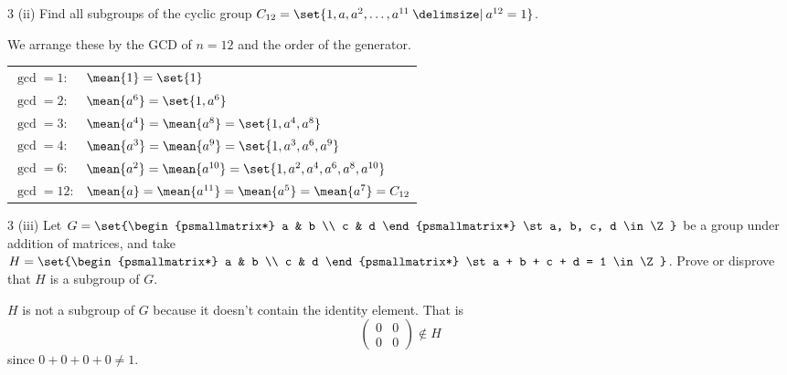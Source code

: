 \documentclass[11pt]{penrose}
\let\cyclic\mean
\begin{document}
\begin{problem}{3 (ii)}
    Find all subgroups of the cyclic group $C_{12} = \set{1, a, a^2, \dots, a^{11} \st a^{12}=1}$.

    \solution We arrange these by the GCD of $n = 12$ and the order of the generator.
    \begin{center}
    \begin{tabularx}{0.8\textwidth}{p{20mm}L}
        $\gcd = 1$: & $\cyclic{1} = \set{1}$\\
        $\gcd = 2$: & $\cyclic{a^6} = \set{1, a^6}$\\
        $\gcd = 3$: & $\cyclic{a^4} = \cyclic{a^8} = \set{1, a^4, a^8}$\\
        $\gcd = 4$: & $\cyclic{a^3} = \cyclic{a^9} = \set{1, a^3, a^6, a^9}$\\
        $\gcd = 6$: & $\cyclic{a^2} = \cyclic{a^{10}} = \set{1, a^2, a^4, a^6, a^8, a^{10}}$\\
        $\gcd = 12$: & $\cyclic{a} = \cyclic{a^{11}} = \cyclic{a^5} = \cyclic{a^7} = C_{12}$\\
    \end{tabularx}
    \end{center}
\end{problem}

\begin{problem}{3 (iii)}
    Let $G = \set{\begin{psmallmatrix*} a & b \\ c & d \end{psmallmatrix*} \st a, b, c, d \in \Z}$ be a group under addition of matrices, and take $H = \set{\begin{psmallmatrix*} a & b \\ c & d \end{psmallmatrix*} \st a + b + c + d = 1 \in \Z}$. Prove or disprove that $H$ is a subgroup of $G$.

    \solution $H$ is not a subgroup of $G$ because it doesn't contain the identity element. That is
    \begin{equation*}
        \begin{pmatrix*} 0 & 0 \\ 0 & 0 \end{pmatrix*} \notin H
    \end{equation*}
    since $0 + 0 + 0 + 0  \neq 1$.
\end{problem}
\end{document}
